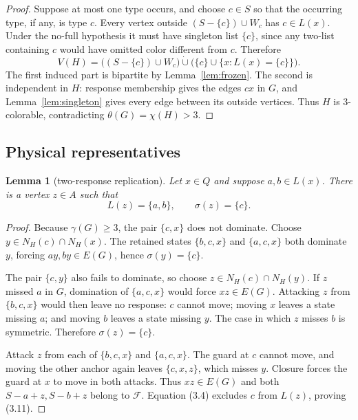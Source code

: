 \documentclass[11pt]{article}
\newtheorem{lemma}[theorem]{Lemma}
\theoremstyle{definition}
\theoremstyle{remark}
\newcommand{\F}{\mathcal F}
\begin{document}
\begin{proof}
Suppose at most one type occurs, and choose \(c\in S\) so that the
occurring type, if any, is type \(c\).  Every vertex outside
\((S-\{c\})\cup W_c\) has \(c\in L(x)\).  Under the no-full hypothesis it
must have singleton list \(\{c\}\), since any two-list containing \(c\)
would have omitted color different from \(c\).  Therefore
\[
 V(H)=
 \bigl((S-\{c\})\cup W_c\bigr)
 \mathbin{\dot\cup}
 \bigl(\{c\}\cup\{x:L(x)=\{c\}\}\bigr).
\tag{3.10}
\]
The first induced part is bipartite by Lemma~\ref{lem:frozen}.  The second
is independent in \(H\): response membership gives the edges \(cx\) in
\(G\), and Lemma~\ref{lem:singleton} gives every edge between its outside
vertices.  Thus \(H\) is 3-colorable, contradicting
\(\theta(G)=\chi(H)>3\).
\end{proof}

\subsection{Physical representatives}

\begin{lemma}[two-response replication]\label{lem:replication}
Let \(x\in Q\) and suppose \(a,b\in L(x)\).  There is a vertex \(z\in A\)
such that
\[
  L(z)=\{a,b\},\qquad \sigma(z)=\{c\}.
\tag{3.11}
\]
\end{lemma}

\begin{proof}
Because \(\gamma(G)\geq3\), the pair \(\{c,x\}\) does not dominate.
Choose \(y\in N_H(c)\cap N_H(x)\).  The retained states
\(\{b,c,x\}\) and \(\{a,c,x\}\) both dominate \(y\), forcing
\(ay,by\in E(G)\), hence \(\sigma(y)=\{c\}\).

The pair \(\{c,y\}\) also fails to dominate, so choose
\(z\in N_H(c)\cap N_H(y)\).  If \(z\) missed \(a\) in \(G\), domination
of \(\{a,c,x\}\) would force \(xz\in E(G)\).  Attacking \(z\) from
\(\{b,c,x\}\) would then leave no response: \(c\) cannot move; moving
\(x\) leaves a state missing \(a\); and moving \(b\) leaves a state
missing \(y\).  The case in which \(z\) misses \(b\) is symmetric.
Therefore \(\sigma(z)=\{c\}\).

Attack \(z\) from each of \(\{b,c,x\}\) and \(\{a,c,x\}\).  The guard at
\(c\) cannot move, and moving the other anchor again leaves
\(\{c,x,z\}\), which misses \(y\).  Closure forces the guard at \(x\) to
move in both attacks.  Thus \(xz\in E(G)\) and both
\(S-a+z,S-b+z\) belong to \(\F\).  Equation (3.4) excludes \(c\) from
\(L(z)\), proving (3.11).
\end{proof}
\end{document}
